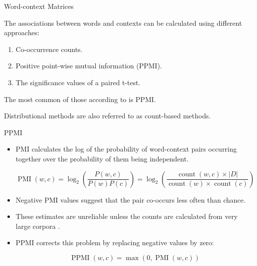 \documentclass[handout]{beamer}
\begin{document}
\begin{frame}{Word-context Matrices}
\begin{scriptsize}
The associations between words and contexts can be calculated using different approaches:
\begin{enumerate}
 \item Co-occurrence counts.
\item Positive point-wise mutual information (PPMI).
\item The significance values of a paired t-test.  
\end{enumerate}

The most common of those according to \cite{JurafskyBook} is PPMI.

Distributional methods are also referred to as count-based methods.

\end{scriptsize}
\end{frame}



\begin{frame}{PPMI}
\begin{scriptsize}
\begin{itemize}
\item  PMI calculates the log of the probability of word-context pairs occurring together over the probability of them being independent. 

\begin{equation}
 \operatorname{PMI}(w, c)= \log_2 \left( \frac{P(w,c)}{P(w)P(c)} \right) = \log_{2} \left ( \frac{\operatorname{count}(w,c)\times |D|}{\operatorname{count}(w)\times \operatorname{count}(c)} \right ) 
\end{equation}






\item Negative PMI values suggest that the pair co-occurs less often than chance. 
\item These estimates are unreliable unless the counts are calculated from very large corpora \cite{JurafskyBook}.
\item  PPMI corrects this problem by replacing negative values by zero:

\begin{equation}
 \operatorname{PPMI}(w, c)= \operatorname{max}(0,\operatorname{PMI}(w, c))
\end{equation}

\end{itemize}
\end{scriptsize}
\end{frame}
\end{document}
